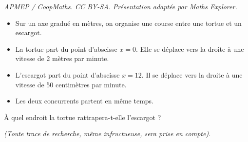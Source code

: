 \documentclass[10pt]{article}
\begin{document}
\noindent\textit{APMEP / CoopMaths. CC BY-SA. Présentation adaptée par Maths Explorer.}\par\medskip
\begin{itemize}
\item Sur un axe gradué en mètres, on organise une course entre une tortue et un escargot.
\item La tortue part du point d'abscisse $x = 0$. Elle se déplace vers la droite à une vitesse de 2 mètres par minute.
\item L'escargot part du point d'abscisse $x = 12$. Il se déplace vers la droite à une vitesse de 50 centimètres par minute.
\item Les deux concurrents partent en même temps.
\end{itemize}

À quel endroit la tortue rattrapera-t-elle l'escargot ?

\textit{(Toute trace de recherche, même infructueuse, sera prise en compte).}

\bigskip

\end{document}
